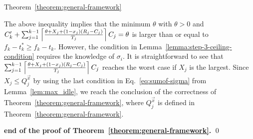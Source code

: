 \begin{appProof}{Theorem~\ref{theorem:general-framework}}

The above inequality implies that the minimum $\theta$ with $\theta > 0$ and
$C_k'+\sum_{j=1}^{k-1} \left\lceil{\frac{\theta+X_j+(1-x_j)(R_j-C_j)}{T_j}}\right\rceil C_j = \theta$
 is larger than or equal to $f_k-t_k^* \geq f_k-t_k$. 
However, the condition in Lemma~\ref{lemma:step-3-ceiling-condition} requires the knowledge of $\sigma_i$. It is straightforward to see that $\sum_{j=1}^{k-1} \left\lceil{\frac{\theta+X_j+(1-x_j)(R_j-C_j)}{T_j}}\right\rceil C_j$ reaches the worst case if $X_j$ is the largest. Since $X_j \leq Q_j^{\vec{x}}$ by using the last condition in Eq.~\eqref{eq:sumof-sigma} from Lemma~\ref{lem:max_idle}, we reach the conclusion of the correctness of Theorem~\ref{theorem:general-framework}, where  $Q_j^{\vec{x}}$ is defined in Theorem~\ref{theorem:general-framework}.

\hfill {\bf end of the proof of Theorem~\ref{theorem:general-framework}.} \qed  


\end{appProof}
